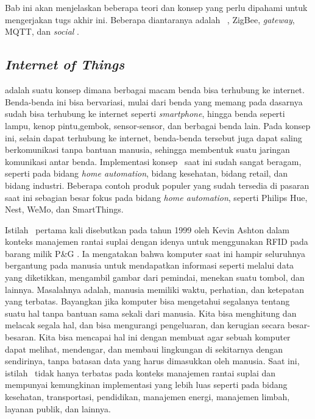 \chapter{\babDua}
Bab ini akan menjelaskan beberapa teori dan konsep yang perlu dipahami untuk mengerjakan tugs akhir ini. Beberapa diantaranya adalah \iot~, ZigBee, \textit{gateway}, MQTT, dan \textit{social} \iot.

\section{\textit{Internet of Things}}
\textit{\IOT} adalah suatu konsep dimana berbagai macam benda bisa terhubung ke internet. Benda-benda ini bisa bervariasi, mulai dari benda yang memang pada dasarnya sudah bisa terhubung ke internet seperti \textit{smartphone}, hingga benda seperti lampu, kenop pintu,gembok, sensor-sensor, dan berbagai benda lain. Pada konsep ini, selain dapat terhubung ke internet, benda-benda tersebut juga dapat saling berkomunikasi tanpa bantuan manusia, sehingga membentuk suatu jaringan komunikasi antar benda. Implementasi konsep \iot~saat ini sudah sangat beragam, seperti pada bidang \textit{home automation}, bidang kesehatan, bidang retail, dan bidang industri. Beberapa contoh produk populer yang sudah tersedia di pasaran saat ini sebagian besar fokus pada bidang \textit{home automation}, seperti Philips Hue, Nest, WeMo, dan SmartThings.

Istilah \iot~pertama kali disebutkan pada tahun 1999 oleh Kevin Ashton dalam konteks manajemen rantai suplai dengan idenya untuk menggunakan RFID pada barang milik P\&G \cite{AshtonIot}. Ia mengatakan bahwa komputer saat ini hampir seluruhnya bergantung pada manusia untuk mendapatkan informasi seperti melalui data yang diketikkan, mengambil gambar dari pemindai, menekan suatu tombol, dan lainnya. Masalahnya adalah, manusia memiliki waktu, perhatian, dan ketepatan yang terbatas. Bayangkan jika komputer bisa mengetahui segalanya tentang suatu hal tanpa bantuan sama sekali dari manusia. Kita bisa menghitung dan melacak segala hal, dan bisa mengurangi pengeluaran, dan kerugian secara besar-besaran. Kita bisa mencapai hal ini dengan membuat agar sebuah komputer dapat melihat, mendengar, dan membaui lingkungan di sekitarnya dengan sendirinya, tanpa batasan data yang harus dimasukkan oleh manusia\cite{AshtonIot}. Saat ini, istilah \iot~tidak hanya terbatas pada konteks manajemen rantai suplai dan mempunyai kemungkinan implementasi yang lebih luas seperti pada bidang kesehatan, transportasi, pendidikan, manajemen energi, manajemen limbah, layanan publik, dan lainnya.


